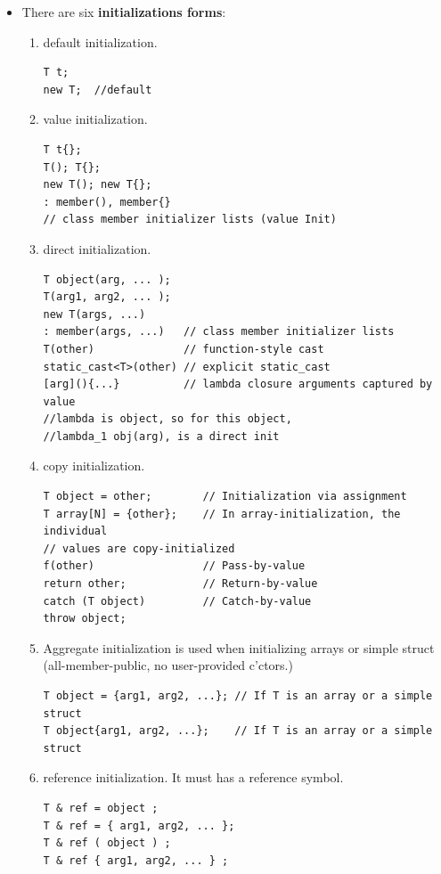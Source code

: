\documentclass[a4paper,11pt,twoside]{book}
\begin{document}
\begin{itemize}
	\item There are six \textbf{initializations forms}:
	\begin{enumerate}
		\item default initialization.
\begin{lstlisting}[numbers=none]
T t;
new T;  //default
\end{lstlisting}
		\item value initialization.
\begin{lstlisting}[numbers=none]
T t{};
T(); T{};
new T(); new T{};
: member(), member{}  
// class member initializer lists (value Init)
\end{lstlisting}
		\item direct initialization.
\begin{lstlisting}[numbers=none]
T object(arg, ... );
T(arg1, arg2, ... );
new T(args, ...)
: member(args, ...)   // class member initializer lists
T(other)              // function-style cast
static_cast<T>(other) // explicit static_cast
[arg](){...}          // lambda closure arguments captured by value
//lambda is object, so for this object, 
//lambda_1 obj(arg), is a direct init
\end{lstlisting}
		\item copy initialization.
\begin{lstlisting}[numbers=none]
T object = other;        // Initialization via assignment
T array[N] = {other};    // In array-initialization, the individual
// values are copy-initialized
f(other)                 // Pass-by-value
return other;            // Return-by-value
catch (T object)         // Catch-by-value
throw object;
\end{lstlisting}
		\item Aggregate initialization is used when initializing arrays or simple struct (all-member-public, no user-provided c'ctors.)
\begin{lstlisting}[numbers=none]
T object = {arg1, arg2, ...}; // If T is an array or a simple struct
T object{arg1, arg2, ...};    // If T is an array or a simple struct
\end{lstlisting}
		\item reference initialization. It must has a reference symbol.
\begin{lstlisting}[numbers=none]
T & ref = object ;
T & ref = { arg1, arg2, ... };
T & ref ( object ) ;
T & ref { arg1, arg2, ... } ;
\end{lstlisting}
	\end{enumerate}



\end{itemize}
\end{document}
